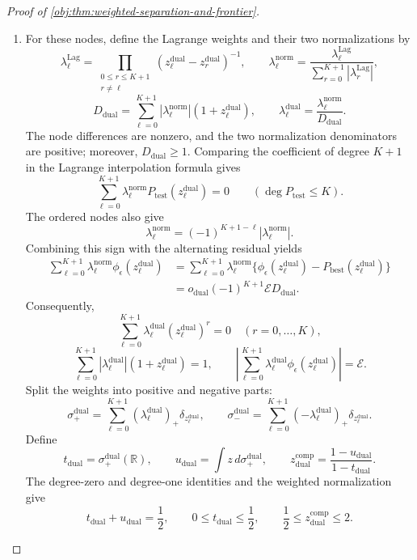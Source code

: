 \begin{proof}[Proof of \cref{obj:thm:weighted-separation-and-frontier}]
\begin{enumerate}
\item
For these nodes, define the Lagrange weights and their two normalizations by
\[
\lambda_\ell^{\mathrm{Lag}}
=\prod_{\substack{0\le r\le K+1\\r\ne\ell}}
(z_\ell^{\mathrm{dual}}-z_r^{\mathrm{dual}})^{-1},
\qquad
\lambda_\ell^{\mathrm{norm}}
=\frac{\lambda_\ell^{\mathrm{Lag}}}
       {\sum_{r=0}^{K+1}|\lambda_r^{\mathrm{Lag}}|},
\]
\[
D_{\mathrm{dual}}
=\sum_{\ell=0}^{K+1}
|\lambda_\ell^{\mathrm{norm}}|(1+z_\ell^{\mathrm{dual}}),
\qquad
\lambda_\ell^{\mathrm{dual}}
=\frac{\lambda_\ell^{\mathrm{norm}}}{D_{\mathrm{dual}}}.
\]
The node differences are nonzero, and the two normalization denominators are positive; moreover, \(D_{\mathrm{dual}}\ge1\).
Comparing the coefficient of degree \(K+1\) in the Lagrange interpolation formula gives
\[
\sum_{\ell=0}^{K+1}
\lambda_\ell^{\mathrm{norm}}P_{\mathrm{test}}(z_\ell^{\mathrm{dual}})
=0
\qquad(\deg P_{\mathrm{test}}\le K).
\]
The ordered nodes also give
\[
\lambda_\ell^{\mathrm{norm}}
=(-1)^{K+1-\ell}|\lambda_\ell^{\mathrm{norm}}|.
\]
Combining this sign with the alternating residual yields
\[
\begin{aligned}
\sum_{\ell=0}^{K+1}
\lambda_\ell^{\mathrm{norm}}\phi_\epsilon(z_\ell^{\mathrm{dual}})
&=
\sum_{\ell=0}^{K+1}
\lambda_\ell^{\mathrm{norm}}
\{\phi_\epsilon(z_\ell^{\mathrm{dual}})
-P_{\mathrm{best}}(z_\ell^{\mathrm{dual}})\}\\
&=o_{\mathrm{dual}}(-1)^{K+1}\mathcal E D_{\mathrm{dual}}.
\end{aligned}
\]
Consequently,
\[
\sum_{\ell=0}^{K+1}
\lambda_\ell^{\mathrm{dual}}(z_\ell^{\mathrm{dual}})^r=0
\quad(r=0,\ldots,K),
\]
\[
\sum_{\ell=0}^{K+1}
|\lambda_\ell^{\mathrm{dual}}|(1+z_\ell^{\mathrm{dual}})=1,
\qquad
\left|
\sum_{\ell=0}^{K+1}
\lambda_\ell^{\mathrm{dual}}\phi_\epsilon(z_\ell^{\mathrm{dual}})
\right|=\mathcal E.
\]
Split the weights into positive and negative parts:
\[
\sigma_+^{\mathrm{dual}}
=\sum_{\ell=0}^{K+1}(\lambda_\ell^{\mathrm{dual}})_+
 \delta_{z_\ell^{\mathrm{dual}}},
\qquad
\sigma_-^{\mathrm{dual}}
=\sum_{\ell=0}^{K+1}(-\lambda_\ell^{\mathrm{dual}})_+
 \delta_{z_\ell^{\mathrm{dual}}}.
\]
Define
\[
t_{\mathrm{dual}}=\sigma_+^{\mathrm{dual}}(\mathbb R),
\qquad
u_{\mathrm{dual}}=\int z\,d\sigma_+^{\mathrm{dual}},
\qquad
z_{\mathrm{dual}}^{\mathrm{comp}}
=\frac{1-u_{\mathrm{dual}}}{1-t_{\mathrm{dual}}}.
\]
The degree-zero and degree-one identities and the weighted normalization give
\[
t_{\mathrm{dual}}+u_{\mathrm{dual}}=\frac12,
\qquad
0\le t_{\mathrm{dual}}\le\frac12,
\qquad
\frac12\le z_{\mathrm{dual}}^{\mathrm{comp}}\le2.
\]
\end{enumerate}
\end{proof}
